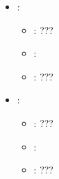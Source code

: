 \begin{itemize}
    \item {}:
           \begin{itemize}
                \item \optionPossibleValues{}: ???
                \item \optionDefaultValue{}: 
                \item \optionDescrption{}: ???
           \end{itemize}
    \item {}:
           \begin{itemize}
                \item \optionPossibleValues{}: ???
                \item \optionDefaultValue{}: 
                \item \optionDescrption{}: ???
           \end{itemize}
\end{itemize}
